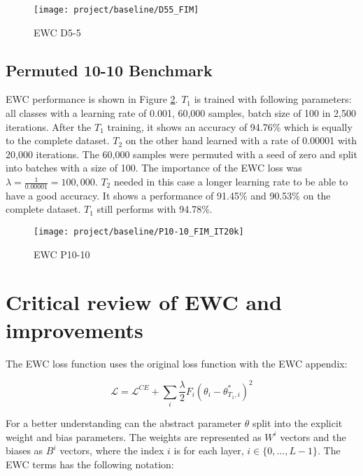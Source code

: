 \begin{figure}[H]
    \centering
    \texttt{[image: project/baseline/D55\_FIM]}
    \caption{EWC D5-5}
    \label{fig:ewc_d5-5}
\end{figure}

\subsection{Permuted 10-10 Benchmark}

EWC performance is shown in Figure \ref{fig:ewc_p10-10}.
$T_1$ is trained with following parameters:
all classes with a
learning rate of 0.001,
60,000 samples,
batch size of 100 in
2,500 iterations.
After the $T_1$ training, it shows an accuracy of 94.76\% which is equally to the complete dataset.
\newline
$T_2$ on the other hand learned with a rate of 0.00001 with 20,000 iterations.
The 60,000 samples were permuted with a seed of zero and split into batches with a size of 100.
The importance of the EWC loss was $\lambda = \frac{1}{0.00001} = 100,000$.
$T_2$ needed in this case a longer learning rate to be able to have a good accuracy.
It shows a performance of 91.45\% and 90.53\% on the complete dataset.
$T_1$ still performs with 94.78\%.

\begin{figure}[H]
    \centering
    \texttt{[image: project/baseline/P10-10\_FIM\_IT20k]}
    \caption{EWC P10-10}
    \label{fig:ewc_p10-10}
\end{figure}

\newpage

\section{Critical review of EWC and improvements}
\label{project_review_improvements}

The EWC loss function uses the original loss function with the EWC appendix:

\begin{equation}
    \mathcal{L} = 
    \mathcal{L}^{CE} 
    + \sum_{i} 
        \frac{\lambda}{2} 
        F_{i} 
        (\theta_{i} - \theta_{T_1,i}^{*})^2
\end{equation}

For a better understanding can the abstract parameter $\theta$ split into the explicit weight and bias parameters.
The weights are represented as $W^i$ vectors and the biases as $B^i$ vectors, where the index $i$ is for each layer, $i \in \{ 0, \dots, L-1 \}$.
The EWC terms has the following notation:

